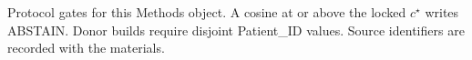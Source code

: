 Protocol gates for this Methods object. A cosine at or above the locked \(c^\star\) writes ABSTAIN. Donor builds require disjoint Patient\_ID values. Source identifiers are recorded with the materials.
